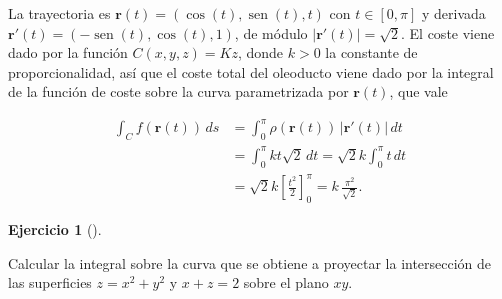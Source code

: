 \documentclass[
  spanish,
  a4paper,
]{scrreport}
\theoremstyle{definition}
\newtheorem{exercise}{Ejercicio}[chapter]
\theoremstyle{remark}
\begin{document}
\begin{tcolorbox}[enhanced jigsaw, arc=.35mm, bottomrule=.15mm, bottomtitle=1mm, breakable, colback=white, colbacktitle=quarto-callout-tip-color!10!white, colframe=quarto-callout-tip-color-frame, coltitle=black, left=2mm, leftrule=.75mm, opacityback=0, opacitybacktitle=0.6, rightrule=.15mm, title=\textcolor{quarto-callout-tip-color}{\faLightbulb}\hspace{0.5em}{Solución}, titlerule=0mm, toprule=.15mm, toptitle=1mm]

La trayectoria es \(\mathbf{r}(t)=(\cos(t),\operatorname{sen}(t),t)\)
con \(t\in[0,\pi]\) y derivada
\(\mathbf{r}'(t)=(-\operatorname{sen}(t),\cos(t),1)\), de módulo
\(|\mathbf{r}'(t)|=\sqrt{2}\). El coste viene dado por la función
\(C(x, y, z) = Kz\), donde \(k>0\) la constante de proporcionalidad, así
que el coste total del oleoducto viene dado por la integral de la
función de coste sobre la curva parametrizada por \(\mathbf{r}(t)\), que
vale

\begin{align*}
\int_C f(\mathbf{r}(t))\, ds 
&= \int_0^{\pi} \rho(\mathbf{r}(t))\,|\mathbf{r}'(t)|\,dt \\
&= \int_0^{\pi} kt\sqrt{2}\,dt
= \sqrt{2}k\int_0^{\pi} t\,dt \\
&= \sqrt{2}k\left[\frac{t^2}{2}\right]_0^{\pi}
= k\,\frac{\pi^2}{\sqrt{2}}.
\end{align*}

\end{tcolorbox}

\begin{exercise}[]\protect\hypertarget{exr-integral-curva-interseccion-superficies}{}\label{exr-integral-curva-interseccion-superficies}

Calcular la integral sobre la curva que se obtiene a proyectar la
intersección de las superficies \(z = x^2+y^2\) y \(x+z=2\) sobre el
plano \(xy\).

\end{exercise}
\end{document}
